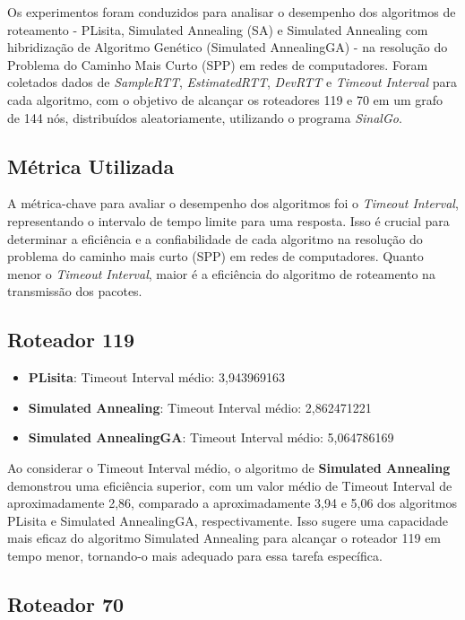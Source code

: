 \documentclass[conference]{IEEEtran}
\begin{document}
Os experimentos foram conduzidos para analisar o desempenho dos algoritmos de roteamento - PLisita, Simulated Annealing (SA) e Simulated Annealing com hibridização de Algoritmo Genético (Simulated AnnealingGA) - na resolução do Problema do Caminho Mais Curto (SPP) em redes de computadores. Foram coletados dados de \textit{SampleRTT}, \textit{EstimatedRTT}, \textit{DevRTT} e \textit{Timeout Interval} para cada algoritmo, com o objetivo de alcançar os roteadores 119 e 70 em um grafo de 144 nós, distribuídos aleatoriamente, utilizando o programa \textit{SinalGo}.

\subsection{Métrica Utilizada}
A métrica-chave para avaliar o desempenho dos algoritmos foi o  \textit{Timeout Interval}, representando o intervalo de tempo limite para uma resposta. Isso é crucial para determinar a eficiência e a confiabilidade de cada algoritmo na resolução do problema do caminho mais curto (SPP) em redes de computadores. Quanto menor o \textit{Timeout Interval}, maior é a eficiência do algoritmo de roteamento na transmissão dos pacotes.

\subsection{Roteador 119}

\begin{itemize}
    \item \textbf{PLisita}: Timeout Interval médio: 3,943969163
    \item \textbf{Simulated Annealing}: Timeout Interval médio: 2,862471221
    \item \textbf{Simulated AnnealingGA}: Timeout Interval médio: 5,064786169
\end{itemize}

Ao considerar o Timeout Interval médio, o algoritmo de \textbf{Simulated Annealing} demonstrou uma eficiência superior, com um valor médio de Timeout Interval de aproximadamente 2,86, comparado a aproximadamente 3,94 e 5,06 dos algoritmos PLisita e Simulated AnnealingGA, respectivamente. Isso sugere uma capacidade mais eficaz do algoritmo Simulated Annealing para alcançar o roteador 119 em tempo menor, tornando-o mais adequado para essa tarefa específica.

\subsection{Roteador 70}
\end{document}
